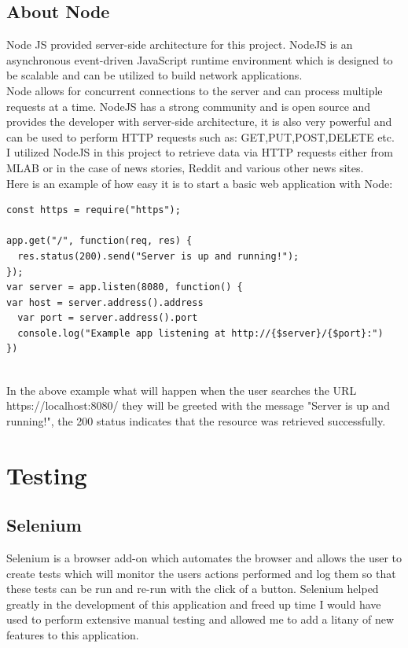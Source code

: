 \subsection{About Node}
Node JS provided server-side architecture for this project.  NodeJS is an asynchronous event-driven JavaScript runtime environment which is designed to be scalable and can be utilized to build network applications\cite{Node}.
\\
Node allows for concurrent connections to the server and can process multiple requests at a time.  NodeJS has a strong community and is open source and provides the developer with server-side architecture, it is also very powerful and can be used to perform HTTP requests such as: GET,PUT,POST,DELETE etc.
\\
 I utilized NodeJS in this project to retrieve data via HTTP requests either from MLAB or in the case of news stories, Reddit and various other news sites.
\\
Here is an example of how easy it is to start a basic web application with Node:
\\
\begin{verbatim}
const https = require("https");

app.get("/", function(req, res) {
  res.status(200).send("Server is up and running!");
});
var server = app.listen(8080, function() {
var host = server.address().address
  var port = server.address().port
  console.log("Example app listening at http://{$server}/{$port}:")
})
\end{verbatim}
\\
In the above example what will happen when the user searches the URL https://localhost:8080/ they will be greeted with the message "Server is up and running!", the 200 status indicates that the resource was retrieved successfully.
\section{Testing}
\subsection{Selenium}
Selenium is a browser add-on which automates the browser and allows the user to create tests which will monitor the users actions performed and log them so that these tests can be run and re-run with the click of a button.  Selenium helped greatly in the development of this application and freed up time I would have used to perform extensive manual testing and allowed me to add a litany of new features to this application.
